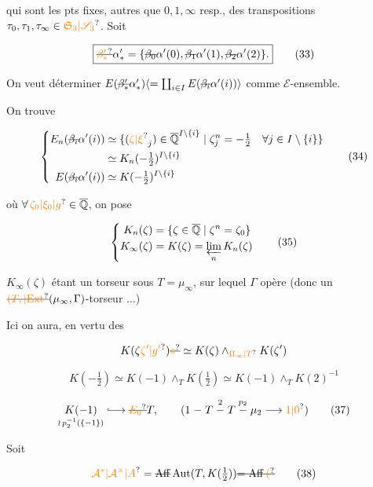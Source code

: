 qui sont les pts fixes, autres que $0,1,\infty$ resp., des transpositions $\tau_0,\tau_1,\tau_\infty\in\unsure{\mathfrak S_3|\mathscr S_3}$. Soit

\[
\boxed{\deleted{\unsure{\beta'_*}}\alpha'_*=\{\deleted{\beta_0}\alpha'(0),\deleted{\beta_1}\alpha'(1),\deleted{\beta_2}\alpha'(2)\}.}
\tag*{(33)}
\]

On veut déterminer $E(\deleted{\beta'_*}\alpha'_*)\inserted{=\coprod_{i\in I}E(\deleted{\beta_i}\alpha'(i))}$ comme $\mathcal E$-ensemble.

On trouve

\[
\left\{\begin{aligned}
E_n(\deleted{\beta_i}\alpha'(i))&\simeq\{(\unsure{\zeta|\xi}_j)\in\overline{\mathbb Q}^{I\setminus\{i\}}\mid \zeta_j^n=-\tfrac12\quad\forall j\in I\setminus\{i\}\}\\
&\simeq K_n(-\tfrac12)^{I\setminus\{i\}}\\
E(\deleted{\beta_i}\alpha'(i))&\simeq K(-\tfrac12)^{I\setminus\{i\}}
\end{aligned}\right.\tag*{(34)}
\]

où $\forall\,\unsure{\zeta_0|\xi_0|g}\in\overline{\mathbb Q}$, on pose

\[
\left\{\begin{aligned}
K_n(\zeta)&=\{\zeta\in\overline{\mathbb Q}\mid\zeta^n=\zeta_0\}\\
K_\infty(\zeta)&=K(\zeta)=\varprojlim_n K_n(\zeta)
\end{aligned}\right.\tag*{(35)}
\]

$K_\infty(\zeta)$ étant un torseur sous $T=\mu_\infty$, sur lequel $\Gamma$ opère (donc un $\deleted{\unsure{(T,|\mathrm{Ext}}}(\mu_\infty,\Gamma)$-torseur ...)

Ici on aura, en vertu des 

\[
K(\zeta\unsure{\zeta'|g'} )\deleted{\unsure{\circ}}\simeq K(\zeta)\wedge_{\unsure{\Pi_\infty|T}}K(\zeta')
\]

\[
K(-\tfrac12)\simeq K(-1)\wedge_T K(\tfrac12)\simeq K(-1)\wedge_T K(2)^{-1}
\tag*{(36)}
\]

\[
\underset{\wr\,p_2^{-1}(\{-1\})}{K(-1)}\lhook\joinrel\longrightarrow\deleted{\unsure{E_0}}T,\qquad
(1\mathrel{-}T\mathrel{\overset{2}{-}}T\mathrel{\overset{p_2}{-}}\mu_2\longrightarrow\unsure{1|0})
\tag*{(37)}
\]


Soit

\[
\unsure{\mathcal A^{*}|\mathcal A^{\times}|A}=\deleted{\operatorname{Aff}}\operatorname{Aut}(T,K(\tfrac12))\deleted{=\operatorname{Aff}\unsure{(}}
\tag*{(38)}
\]


